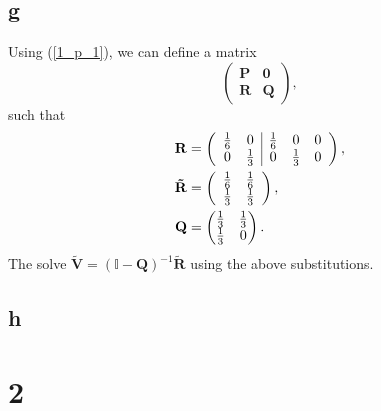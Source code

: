 \documentclass{article}
\begin{document}
\subsection{g}
Using (\ref{1_p_1}), we can define a matrix
\begin{equation}
    \begin{pmatrix}
        \mathbf{P} & \mathbf{0}\\
        \mathbf{R} & \mathbf{Q}
    \end{pmatrix},
\end{equation}
such that
\begin{align}
    \mathbf{R} &= 
    \left(\begin{array}{c c | c c c}
        \frac{1}{6} & 0 & \frac{1}{6} & 0 & 0 \\
        0 & \frac{1}{3} & 0 & \frac{1}{3} & 0
    \end{array}\right), \\
    \mathbf{\tilde{R}} &= 
    \left(\begin{array}{c c}
        \frac{1}{6} & \frac{1}{6} \\
        \frac{1}{3} & \frac{1}{3}
    \end{array}\right), \\    
    \mathbf{Q} &= \begin{pmatrix}
        \frac{1}{3} & \frac{1}{3} \\
        \frac{1}{3} & 0
    \end{pmatrix}.
\end{align}
The solve $\mathbf{\tilde{V}} = (\mathbb{I} - \mathbf{Q})^{-1}\mathbf{\tilde{R}}$ using the above substitutions.

\subsection{h}


\section{2}
\end{document}
